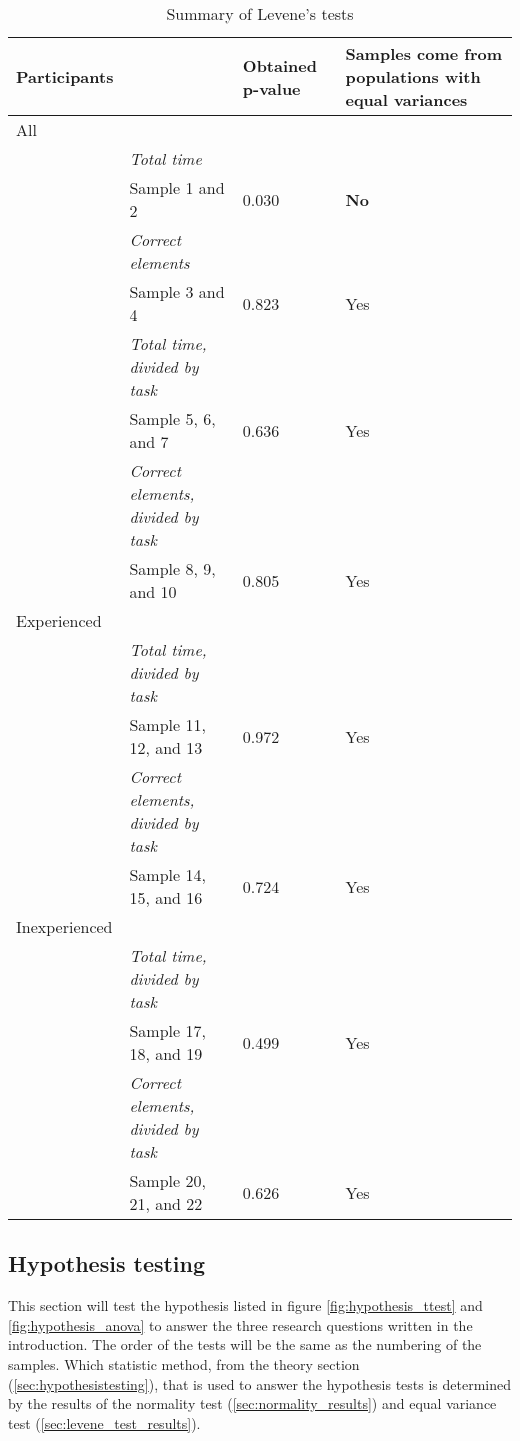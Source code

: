 \begin{longtable}{p{}|p{}|p{}|p{}}
	\caption[Summary, Levene's tests]{Summary of Levene's tests} \label{tab:levenestest_summary} \\
	 Participants & & Obtained p-value & Samples come from populations with equal variances \\ \hline
	 All & & & \\
	 & \textit{Total time} & & \\
	& Sample 1 and 2 & 0.030 & \textbf{No}  \\ 
	& \textit{Correct elements} & & \\
	& Sample 3 and 4 &0.823& Yes   \\ 
	& \textit{Total time, divided by task}& & \\
	& Sample 5, 6, and 7 & 0.636 & Yes \\ 
	& \textit{Correct elements, divided by task} & & \\
	& Sample 8, 9, and 10 & 0.805  & Yes  \\ \hline
	Experienced & & & \\
	& \textit{Total time, divided by task} & & \\
	& Sample 11, 12, and 13 & 0.972 & Yes  \\ 
	& \textit{Correct elements, divided by task} & & \\
	& Sample 14, 15, and 16 & 0.724 & Yes \\ \hline
	Inexperienced & & & \\
	& \textit{Total time, divided by task} & & \\
	& Sample 17, 18, and 19 & 0.499  & Yes  \\ 
	& \textit{Correct elements, divided by task} & & \\
	& Sample 20, 21, and 22 & 0.626 & Yes \\ \hline
\end{longtable}

\vspace{0.5cm}

\subsection{Hypothesis testing}\label{sec:hypothesis_results}
This section will test the hypothesis listed in figure \ref{fig:hypothesis_ttest} and \ref{fig:hypothesis_anova} to answer the three research questions written in the introduction. The order of the tests will be the same as the numbering of the samples. Which statistic method, from the theory section (\ref{sec:hypothesistesting}), that is used to answer the hypothesis tests is determined by the results of the normality test (\ref{sec:normality_results}) and equal variance test (\ref{sec:levene_test_results}).

